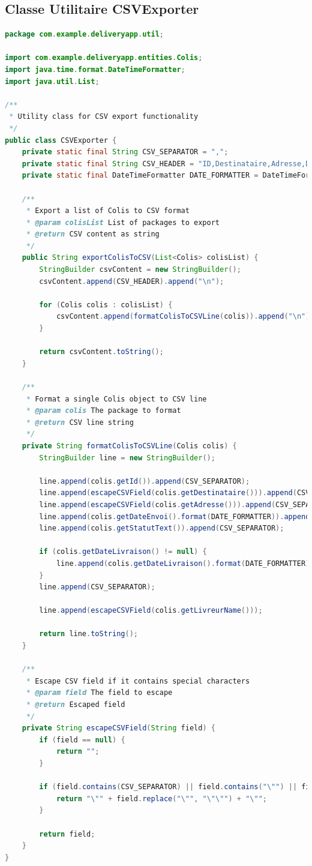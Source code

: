 \documentclass{rapportENSIAS}
\begin{document}
\subsection{Classe Utilitaire CSVExporter}

\begin{lstlisting}[language=Java, caption=Exportateur CSV]
package com.example.deliveryapp.util;

import com.example.deliveryapp.entities.Colis;
import java.time.format.DateTimeFormatter;
import java.util.List;

/**
 * Utility class for CSV export functionality
 */
public class CSVExporter {
    private static final String CSV_SEPARATOR = ",";
    private static final String CSV_HEADER = "ID,Destinataire,Adresse,Date Envoi,Statut,Date Livraison,Livreur";
    private static final DateTimeFormatter DATE_FORMATTER = DateTimeFormatter.ofPattern("dd/MM/yyyy");
    
    /**
     * Export a list of Colis to CSV format
     * @param colisList List of packages to export
     * @return CSV content as string
     */
    public String exportColisToCSV(List<Colis> colisList) {
        StringBuilder csvContent = new StringBuilder();
        csvContent.append(CSV_HEADER).append("\n");
        
        for (Colis colis : colisList) {
            csvContent.append(formatColisToCSVLine(colis)).append("\n");
        }
        
        return csvContent.toString();
    }
    
    /**
     * Format a single Colis object to CSV line
     * @param colis The package to format
     * @return CSV line string
     */
    private String formatColisToCSVLine(Colis colis) {
        StringBuilder line = new StringBuilder();
        
        line.append(colis.getId()).append(CSV_SEPARATOR);
        line.append(escapeCSVField(colis.getDestinataire())).append(CSV_SEPARATOR);
        line.append(escapeCSVField(colis.getAdresse())).append(CSV_SEPARATOR);
        line.append(colis.getDateEnvoi().format(DATE_FORMATTER)).append(CSV_SEPARATOR);
        line.append(colis.getStatutText()).append(CSV_SEPARATOR);
        
        if (colis.getDateLivraison() != null) {
            line.append(colis.getDateLivraison().format(DATE_FORMATTER));
        }
        line.append(CSV_SEPARATOR);
        
        line.append(escapeCSVField(colis.getLivreurName()));
        
        return line.toString();
    }
    
    /**
     * Escape CSV field if it contains special characters
     * @param field The field to escape
     * @return Escaped field
     */
    private String escapeCSVField(String field) {
        if (field == null) {
            return "";
        }
        
        if (field.contains(CSV_SEPARATOR) || field.contains("\"") || field.contains("\n")) {
            return "\"" + field.replace("\"", "\"\"") + "\"";
        }
        
        return field;
    }
}
\end{lstlisting}
\end{document}
